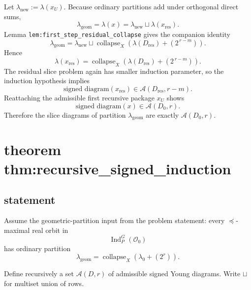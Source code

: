 \documentclass[
]{article}
\begin{document}
Let \(\lambda_{\mathrm{new}}:=\lambda(x_U)\). Because ordinary
partitions add under orthogonal direct sums, \[
\lambda_{\mathrm{geom}}=\lambda(x)=\lambda_{\mathrm{new}}\sqcup \lambda(x_{\mathrm{res}}).
\] Lemma \texttt{lem:first\_step\_residual\_collapse} gives the
companion identity \[
\lambda_{\mathrm{geom}}
=
\lambda_{\mathrm{new}}\sqcup
\operatorname{collapse}_X(\lambda(D_{\mathrm{res}})+(2^{\,r-m})).
\] Hence \[
\lambda(x_{\mathrm{res}})
=
\operatorname{collapse}_X(\lambda(D_{\mathrm{res}})+(2^{\,r-m})).
\] The residual slice problem again has smaller induction parameter, so
the induction hypothesis implies \[
\text{signed diagram}(x_{\mathrm{res}})\in \mathcal A(D_{\mathrm{res}},r-m).
\] Reattaching the admissible first recursive package \(x_U\) shows \[
\text{signed diagram}(x)\in \mathcal A(D_0,r).
\] Therefore the slice diagrams of partition \(\lambda_{\mathrm{geom}}\)
are exactly \(\mathcal A(D_0,r)\).

\section{theorem
thm:recursive\_signed\_induction}\label{theorem-thmrecursive_signed_induction}

\subsection{statement}\label{statement-26}

Assume the geometric-partition input from the problem statement: every
\(\preceq\)-maximal real orbit in \[
\operatorname{Ind}_P^G(\mathcal O_0)
\] has ordinary partition \[
\lambda_{\mathrm{geom}}=\operatorname{collapse}_X(\lambda_0+(2^r)).
\]

Define recursively a set \(\mathcal A(D,r)\) of admissible signed Young
diagrams. Write \(\sqcup\) for multiset union of rows.
\end{document}
